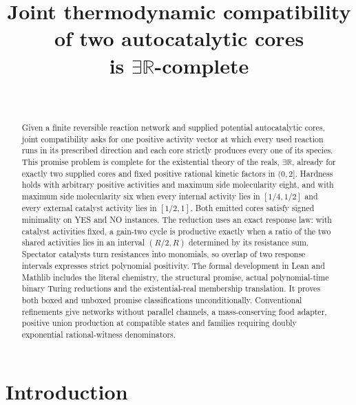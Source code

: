 \documentclass[11pt,a4paper]{article}
\title{Joint thermodynamic compatibility of two autocatalytic cores\\ is \texorpdfstring{$\exists\mathbb{R}$}{existential-real}-complete}
\author{\PaperAuthor\\ \PaperAffiliation}
\date{\PaperDate}
\theoremstyle{plain}
\theoremstyle{definition}
\theoremstyle{remark}
\newcommand{\ER}{\exists\mathbb{R}}
\begin{document}
\maketitle

\begin{abstract}
Given a finite reversible reaction network and supplied potential autocatalytic cores, joint compatibility asks for one positive activity vector at which every used reaction runs in its prescribed direction and each core strictly produces every one of its species. This promise problem is complete for the existential theory of the reals, $\ER$, already for exactly two supplied cores and fixed positive rational kinetic factors in $(0,2]$. Hardness holds with arbitrary positive activities and maximum side molecularity eight, and with maximum side molecularity six when every internal activity lies in $[1/4,1/2]$ and every external catalyst activity lies in $[1/2,1]$. Both emitted cores satisfy signed minimality on YES and NO instances. The reduction uses an exact response law: with catalyst activities fixed, a gain-two cycle is productive exactly when a ratio of the two shared activities lies in an interval $(R/2,R)$ determined by its resistance sum. Spectator catalysts turn resistances into monomials, so overlap of two response intervals expresses strict polynomial positivity. The formal development in Lean and Mathlib includes the literal chemistry, the structural promise, actual polynomial-time binary Turing reductions and the existential-real membership translation. It proves both boxed and unboxed promise classifications unconditionally. Conventional refinements give networks without parallel channels, a mass-conserving food adapter, positive union production at compatible states and families requiring doubly exponential rational-witness denominators.
\end{abstract}

\section{Introduction}\label{sec:intro}
\end{document}
